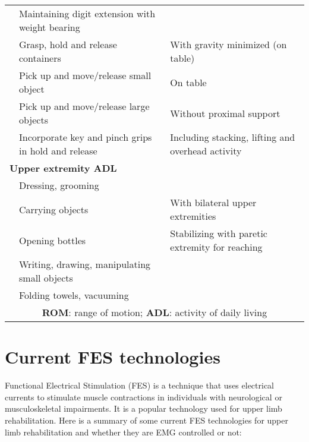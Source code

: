 \begin{table}[htbp]
\begin{tabular}{p{2.5cm}p{5cm}p{7cm}}
     & Maintaining digit extension with weight bearing & \\
     & Grasp, hold and release containers & With gravity minimized (on table) \\
     & Pick up and move/release small object & On table \\
     & Pick up and move/release large objects & Without proximal support \\
     & Incorporate key and pinch grips in hold and release & Including stacking, lifting and overhead activity \\
    \multicolumn{3}{l}{\textbf{Upper extremity ADL}} \\
     & Dressing, grooming & \\
     & Carrying objects & With bilateral upper extremities \\
     & Opening bottles & Stabilizing with paretic extremity for reaching \\
     & Writing, drawing, manipulating small objects & \\
     & Folding towels, vacuuming\\
     \bottomrule
     \multicolumn{3}{c}{ \textbf{ROM}: range of motion; \textbf{ADL}: activity of daily living}
    \end{tabular}
    \label{BankofExercises}
\end{table}

\newpage
\section{Current FES technologies}
Functional Electrical Stimulation (FES) is a technique that uses electrical currents to stimulate muscle contractions in individuals with neurological or musculoskeletal impairments. It is a popular technology used for upper limb rehabilitation. Here is a summary of some current FES technologies for upper limb rehabilitation and whether they are EMG controlled or not:

